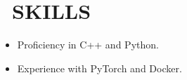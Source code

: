 \section{\faCogs\ SKILLS}

\begin{itemize}
	\item Proficiency in C++ and Python.
	\item Experience with PyTorch and Docker.
\end{itemize}